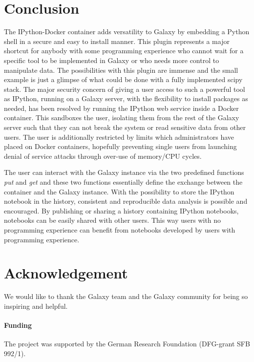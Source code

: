 \documentclass{bioinfo}
\begin{document}
\section{Conclusion}
The IPython-Docker container adds versatility to Galaxy by embedding a Python shell in a secure and easy to install manner.
This plugin represents a major shortcut for anybody with some programming experience who cannot wait for a specific tool to
be implemented in Galaxy or who needs more control to manipulate data. The possibilities with this plugin are immense and the
small example is just a glimpse of what could be done with a fully implemented scipy stack. The major security concern
of giving a user access to such a powerful tool as IPython, running on a Galaxy server, with the flexibility to install
packages as needed, has been resolved by running the IPython web service inside a Docker container. This sandboxes the user,
isolating them from the rest of the Galaxy server such that they can not break the system or read sensitive data from other
users. The user is additionally restricted by limits which administrators have placed on Docker containers,
hopefully preventing single users from launching denial of service attacks through over-use of memory/CPU cycles.

The user can interact with the Galaxy instance via the two predefined functions \textit{put} and \textit{get} and these two
functions essentially define the exchange between the container and the Galaxy instance. With the possibility to store the
IPython notebook in the history, consistent and reproducible data analysis is possible and encouraged. 
By publishing or sharing a history containing IPython notebooks, notebooks can be easily shared with other users.
This way users with no programming experience can benefit from notebooks developed by users with programming experience.



\section*{Acknowledgement}
We would like to thank the Galaxy team and the Galaxy community for being so inspiring and helpful.


\paragraph{Funding\textcolon} The project was supported by the German Research Foundation (DFG-grant SFB 992/1).
\end{document}

